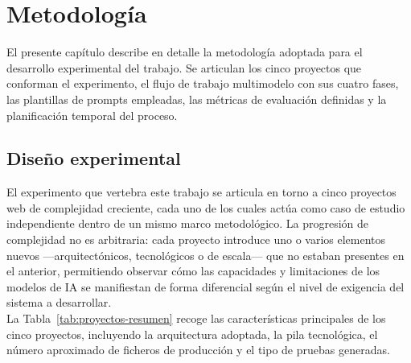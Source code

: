 
\chapter{Metodología} \label{chap:Metodology}

El presente capítulo describe en detalle la metodología adoptada para el desarrollo experimental del trabajo.
Se articulan los cinco proyectos que conforman el experimento, el flujo de trabajo multimodelo con sus cuatro fases, las plantillas de prompts empleadas, las métricas de evaluación definidas y la planificación temporal del proceso.\\

\section{Diseño experimental} \label{sec:diseno-experimental}

El experimento que vertebra este trabajo se articula en torno a cinco proyectos web de complejidad creciente, cada uno de los cuales actúa como caso de estudio independiente dentro de un mismo marco metodológico.
La progresión de complejidad no es arbitraria: cada proyecto introduce uno o varios elementos nuevos ---arquitectónicos, tecnológicos o de escala--- que no estaban presentes en el anterior, permitiendo observar cómo las capacidades y limitaciones de los modelos de \ac{IA} se manifiestan de forma diferencial según el nivel de exigencia del sistema a desarrollar.\\

La Tabla~\ref{tab:proyectos-resumen} recoge las características principales de los cinco proyectos, incluyendo la arquitectura adoptada, la pila tecnológica, el número aproximado de ficheros de producción y el tipo de pruebas generadas.\\


